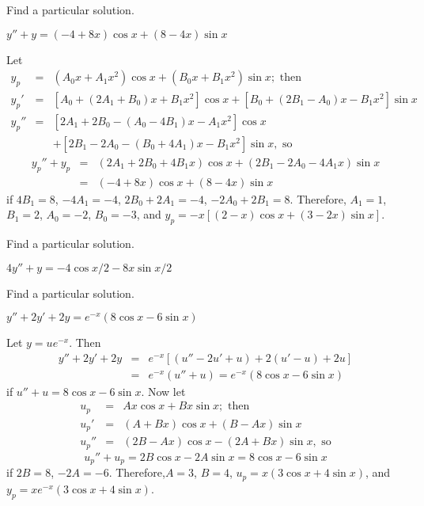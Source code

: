 \documentclass{ximera}
\begin{document}
\begin{problem}\label{exer:5.5.8} Find a particular solution. 

$y''+y=(-4+8x)\cos x+(8-4x)\sin x$

\begin{solution}
Let
\begin{eqnarray*}
y_p&=&(A_0x+A_1x^2)\cos x+(B_0x+B_1x^2)\sin x;\text{ then}\\
y_p'&=&\left[A_0+(2A_1+B_0)x+B_1x^2\right]\cos x
+\left[B_0+(2B_1-A_0)x-B_1x^2\right]\sin x\\
y_p''&=&
\left[2A_1+2B_0-(A_0-4B_1)x-A_1x^2\right]\cos x\\ &&+
\left[2B_1-2A_0-(B_0+4A_1)x-B_1x^2\right]\sin x, \text{ so}
\end{eqnarray*}
\begin{eqnarray*}
y_p''+y_p&=&(2A_1+2B_0+4B_1x)\cos x+(2B_1-2A_0-4A_1x)\sin x\\ &=&
(-4+8x)\cos x+(8-4x)\sin x
\end{eqnarray*}
if $4B_1=8$, $-4A_1=-4$, $2B_0+2A_1=-4$, $-2A_0+2B_1=8$. Therefore,
$A_1=1$, $B_1=2$, $A_0=-2$, $B_0=-3$, and $y_p=-x\left[(2-x)\cos
x+(3-2x)\sin x\right]$.
\end{solution}
\end{problem}

\begin{problem}\label{exer:5.5.9} Find a particular solution. 

$4y''+y=-4\cos x/2-8x\sin x/2$
\end{problem}

\begin{problem}\label{exer:5.5.10} Find a particular solution. 

$y''+2y'+2y=e^{-x}(8\cos x-6\sin x)$

\begin{solution}
Let $y=ue^{-x}$. Then
\begin{eqnarray*}
y''+2y'+2y&=&e^{-x}\left[(u''-2u'+u)+2(u'-u)+2u\right]\\
&=&e^{-x}(u''+u)= e^{-x}(8\cos x-6\sin x)
\end{eqnarray*}
 if $u''+u=8\cos x-6\sin x$.
Now let
\begin{eqnarray*}
u_p&=&Ax\cos x+Bx\sin x; \text{ then}\\
u_p'&=&(A+Bx)\cos x+(B-Ax)\sin x\\
u_p''&=&(2B-Ax)\cos x-(2A+Bx)\sin x, \text{ so}
\end{eqnarray*}
$$
u_p''+u_p=2B\cos x-2A\sin x=8\cos x-6\sin x
$$
if $2B=8$, $-2A=-6$. Therefore,$A=3$, $B=4$, $u_p=x(3\cos x+4\sin x)$,
and $y_p=xe^{-x}(3\cos x+4\sin x)$.

\end{solution}
\end{problem}
\end{document}
